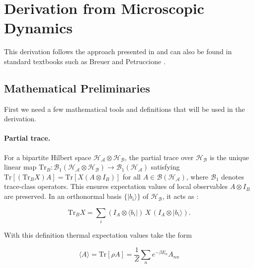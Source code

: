 
\section{Derivation from Microscopic Dynamics}
\label{sec:Derivation_redfield_eq}

\noindent
This derivation follows the approach presented in \cite{manzano2020shortintroductionlindblad} and can also be found in standard textbooks such as Breuer and Petruccione \cite{breuerpetruccione2009theoryopenquantum}. 

\subsection{Mathematical Preliminaries}
\label{subsec:preliminaries_tools}

First we need a few mathematical tools and definitions that will be used in the derivation.
\noindent
\paragraph{Partial trace.}

\noindent
For a bipartite Hilbert space $\mathcal{H_A} \otimes \mathcal{H_B}$, the partial trace over $\mathcal{H_B}$ is the unique linear map $\mathrm{Tr}_B: \mathcal{B}_1(\mathcal{H_A} \otimes \mathcal{H_B}) \to \mathcal{B}_1(\mathcal{H_A})$ satisfying $\mathrm{Tr}[(\mathrm{Tr}_B X) A] = \mathrm{Tr}[X (A \otimes I_B)]$ for all $A \in \mathcal{B}(\mathcal{H_A})$, where $\mathcal{B}_1$ denotes trace-class operators. This ensures expectation values of local observables $A \otimes I_B$ are preserved. In an orthonormal basis $\{|b_i\rangle\}$ of $\mathcal{H_B}$, it acts as \cite{problemssolutionsquantum}:

\begin{equation} \label{eq:ho_partial_trace_definition}
	\mathrm{Tr}_B X = \sum_i (I_A \otimes \langle b_i|) \, X \, (I_A \otimes |b_i\rangle).
\end{equation}

\noindent
With this definition thermal expectation values take the form

\begin{equation} \label{eq:ho_expectation_value} \langle A \rangle = \mathrm{Tr}[\rho A] = \frac{1}{Z} \sum_n e^{-\beta E_n} A_{nn}
\end{equation}

